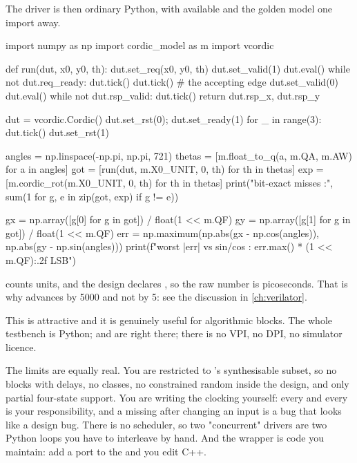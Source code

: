The driver is then ordinary Python, with  available and the
golden model one import away.

\begin{pycode}[caption={Driving the Verilated model from Python
(\file{drive\_pybind.py}).},label={lst:python:pybinddrv}]
import numpy as np
import cordic_model as m
import vcordic

def run(dut, x0, y0, th):
    dut.set_req(x0, y0, th)
    dut.set_valid(1)
    dut.eval()
    while not dut.req_ready:
        dut.tick()
    dut.tick()                       # the accepting edge
    dut.set_valid(0)
    dut.eval()
    while not dut.rsp_valid:
        dut.tick()
    return dut.rsp_x, dut.rsp_y

dut = vcordic.Cordic()
dut.set_rst(0); dut.set_ready(1)
for _ in range(3):
    dut.tick()
dut.set_rst(1)

angles = np.linspace(-np.pi, np.pi, 721)
thetas = [m.float_to_q(a, m.QA, m.AW) for a in angles]
got = [run(dut, m.X0_UNIT, 0, th) for th in thetas]
exp = [m.cordic_rot(m.X0_UNIT, 0, th) for th in thetas]
print("bit-exact misses  :",
      sum(1 for g, e in zip(got, exp) if g != e))

gx = np.array([g[0] for g in got]) / float(1 << m.QF)
gy = np.array([g[1] for g in got]) / float(1 << m.QF)
err = np.maximum(np.abs(gx - np.cos(angles)), np.abs(gy - np.sin(angles)))
print(f"worst |err| vs sin/cos : {err.max() * (1 << m.QF):.2f} LSB")
\end{pycode}


 counts  units, and the design declares
, so the raw number is picoseconds. That is why
 advances by 5000 and not by 5: see the discussion in
\cref{ch:verilator}.

This is attractive and it is genuinely useful for algorithmic blocks. The
whole testbench is Python;  and  are right
there; there is no VPI, no DPI, no simulator licence.

The limits are equally real. You are restricted to 's
synthesisable subset, so no  blocks with delays, no classes, no
constrained random inside the design, and only partial four-state support.
You are writing the clocking yourself: every  and every
 is your responsibility, and a missing  after
changing an input is a bug that looks like a design bug. There is no
scheduler, so two "concurrent" drivers are two Python loops you have to
interleave by hand. And the wrapper is code you maintain: add a port to the
\DUT{} and you edit C++.

